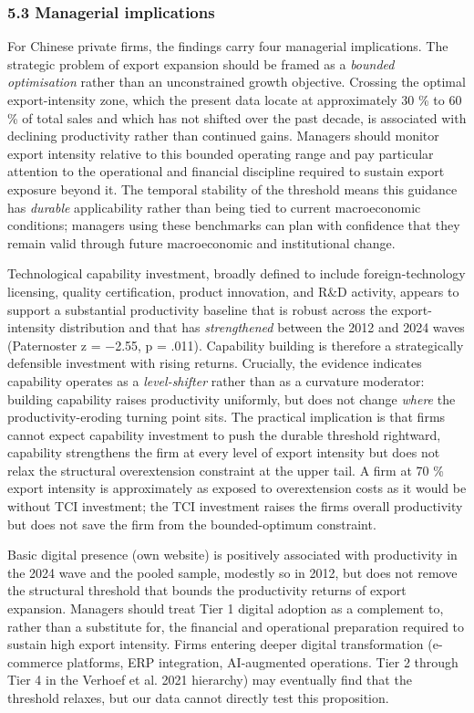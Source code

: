 \documentclass[12pt,a4paper]{article}
\begin{document}
\hypertarget{53-managerial-implications}{%
\subsubsection{5.3 Managerial
implications}\label{53-managerial-implications}}

For Chinese private firms, the findings carry four managerial
implications. The strategic problem of export expansion should be framed
as a \emph{bounded optimisation} rather than an unconstrained growth
objective. Crossing the optimal export-intensity zone, which the present
data locate at approximately 30 \% to 60 \% of total sales and which has
not shifted over the past decade, is associated with declining
productivity rather than continued gains. Managers should monitor export
intensity relative to this bounded operating range and pay particular
attention to the operational and financial discipline required to
sustain export exposure beyond it. The temporal stability of the
threshold means this guidance has \emph{durable} applicability rather
than being tied to current macroeconomic conditions; managers using
these benchmarks can plan with confidence that they remain valid through
future macroeconomic and institutional change.

Technological capability investment, broadly defined to include
foreign-technology licensing, quality certification, product innovation,
and R\&D activity, appears to support a substantial productivity
baseline that is robust across the export-intensity distribution and
that has \emph{strengthened} between the 2012 and 2024 waves
(Paternoster z = −2.55, p = .011). Capability building is therefore a
strategically defensible investment with rising returns. Crucially, the
evidence indicates capability operates as a \emph{level-shifter} rather
than as a curvature moderator: building capability raises productivity
uniformly, but does not change \emph{where} the productivity-eroding
turning point sits. The practical implication is that firms cannot
expect capability investment to push the durable threshold rightward,
capability strengthens the firm at every level of export intensity but
does not relax the structural overextension constraint at the upper
tail. A firm at 70 \% export intensity is approximately as exposed to
overextension costs as it would be without TCI investment; the TCI
investment raises the firm\textquotesingle s overall productivity but
does not save the firm from the bounded-optimum constraint.

Basic digital presence (own website) is positively associated with
productivity in the 2024 wave and the pooled sample, modestly so in
2012, but does not remove the structural threshold that bounds the
productivity returns of export expansion. Managers should treat Tier 1
digital adoption as a complement to, rather than a substitute for, the
financial and operational preparation required to sustain high export
intensity. Firms entering deeper digital transformation (e-commerce
platforms, ERP integration, AI-augmented operations. Tier 2 through Tier
4 in the Verhoef et al. 2021 hierarchy) may eventually find that the
threshold relaxes, but our data cannot directly test this proposition.
\end{document}
